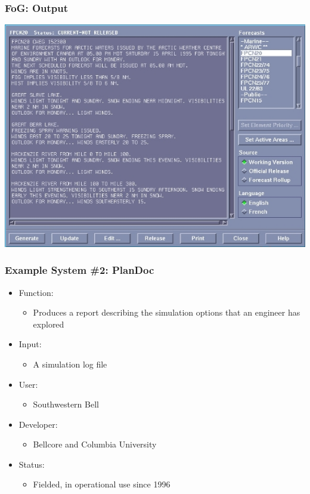 \documentclass[compress,color=usenames]{beamer}
\begin{document}
\begin{frame}
\frametitle{FoG: Output}

\begin{center}
\includegraphics[scale=.4]{pics/pic3.jpg}
\end{center}

\end{frame}

\begin{frame}
\frametitle{Example System \#2: PlanDoc}

\label{f22}
\begin{itemize}
\item { {Function: }}
\begin{itemize}
\item Produces a report describing the simulation options that an engineer has explored
\end{itemize}
\item { {Input: }}
\begin{itemize}
\item A simulation log file
\end{itemize}
\item { {User: }}
\begin{itemize}
\item Southwestern Bell
\end{itemize}
\item { {Developer: }}
\begin{itemize}
\item Bellcore and Columbia University
\end{itemize}
\item { {Status: }}
\begin{itemize}
\item Fielded, in operational use since 1996
\end{itemize}
\end{itemize}

\end{frame}
\end{document}

